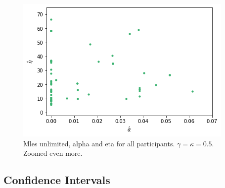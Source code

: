 \begin{figure}
\begin{minipage}{0.48\textwidth}
        \centering
        \includegraphics[scale=0.37]{pictures/Gamma=kappa=0.5/plotted_mles_unlim_gk0.5_zoomed2.png}
        \caption{Mles unlimited, alpha and eta for all participants. $\gamma=\kappa=0.5$. Zoomed even more.}
        \label{fig:gk0.5_mles_unlimited_zoomed2}
    \end{minipage}
\end{figure}




\subsection{Confidence Intervals}


